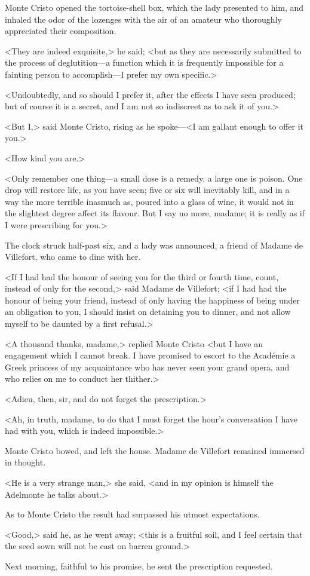  Monte Cristo opened the tortoise-shell box, which the lady presented to him, and inhaled the odor of the lozenges with the air of an amateur who thoroughly appreciated their composition. 

 <They are indeed exquisite,> he said; <but as they are necessarily submitted to the process of deglutition—a function which it is frequently impossible for a fainting person to accomplish—I prefer my own specific.> 

 <Undoubtedly, and so should I prefer it, after the effects I have seen produced; but of course it is a secret, and I am not so indiscreet as to ask it of you.> 

 <But I,> said Monte Cristo, rising as he spoke—<I am gallant enough to offer it you.>

<How kind you are.> 

 <Only remember one thing—a small dose is a remedy, a large one is poison. One drop will restore life, as you have seen; five or six will inevitably kill, and in a way the more terrible inasmuch as, poured into a glass of wine, it would not in the slightest degree affect its flavour. But I say no more, madame; it is really as if I were prescribing for you.> 

 The clock struck half-past six, and a lady was announced, a friend of Madame de Villefort, who came to dine with her. 

 <If I had had the honour of seeing you for the third or fourth time, count, instead of only for the second,> said Madame de Villefort; <if I had had the honour of being your friend, instead of only having the happiness of being under an obligation to you, I should insist on detaining you to dinner, and not allow myself to be daunted by a first refusal.> 

 <A thousand thanks, madame,> replied Monte Cristo <but I have an engagement which I cannot break. I have promised to escort to the Académie a Greek princess of my acquaintance who has never seen your grand opera, and who relies on me to conduct her thither.> 

 <Adieu, then, sir, and do not forget the prescription.> 

 <Ah, in truth, madame, to do that I must forget the hour's conversation I have had with you, which is indeed impossible.> 

 Monte Cristo bowed, and left the house. Madame de Villefort remained immersed in thought. 

 <He is a very strange man,> she said, <and in my opinion is himself the Adelmonte he talks about.> 

 As to Monte Cristo the result had surpassed his utmost expectations. 

 <Good,> said he, as he went away; <this is a fruitful soil, and I feel certain that the seed sown will not be cast on barren ground.> 

 Next morning, faithful to his promise, he sent the prescription requested. 